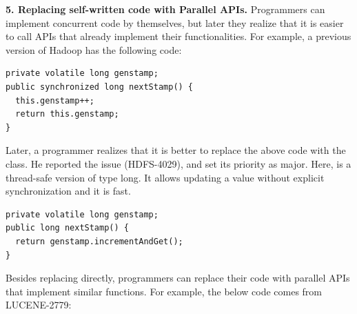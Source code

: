 \noindent
\textbf{5. Replacing self-written code with Parallel APIs.} Programmers can implement concurrent code by themselves, but later they realize that it is easier to call APIs that already implement their functionalities. For example, a previous version of Hadoop has the following code:%

%

\begin{lstlisting}
private volatile long genstamp;
public synchronized long nextStamp() {
  this.genstamp++;
  return this.genstamp;
}
\end{lstlisting}

Later, a programmer realizes that it is better to replace the above code with the  class. He reported the issue (HDFS-4029), and set its priority as major. Here,  is a thread-safe version of type long. It allows updating a  value without explicit synchronization and it is fast.



\begin{lstlisting}
private volatile long genstamp;
public long nextStamp() {
  return genstamp.incrementAndGet();
}
\end{lstlisting}

Besides replacing directly, programmers can replace their code with parallel APIs that implement similar functions. For example, the below code comes from LUCENE-2779:

